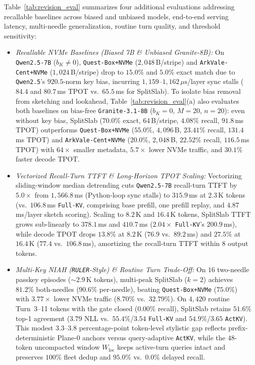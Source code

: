 \documentclass[final,5p,times,twocolumn]{elsarticle}
\theoremstyle{definition}
\theoremstyle{remark}
\newcommand{\SplitSlab}{\textup{\textsc{SplitSlab}}}
\def\SplitSlab{SplitSlab}%
\begin{document}
Table~\ref{tab:revision_eval} summarizes four additional evaluations addressing recallable baselines across biased and unbiased models, end-to-end serving latency, multi-needle generalization, routine turn quality, and threshold sensitivity:
\begin{itemize}
  \item \emph{Recallable NVMe Baselines (Biased 7B \& Unbiased Granite-8B):} On \texttt{Qwen2.5-7B} ($b_K{\neq}0$), \texttt{Quest-Box+NVMe} ($2{,}048$\,B/stripe) and \texttt{ArkVale-Cent+NVMe} ($1{,}024$\,B/stripe) drop to $15.0\%$ and $5.0\%$ exact match due to \texttt{Qwen2.5}'s $920.5$-norm key bias, incurring $1{,}159$--$1{,}162\,\mu\mathrm{s}$/layer sync stalls ($84.4$ and $80.7$\,ms TPOT vs.\ $65.5$\,ms for \SplitSlab{}). To isolate bias removal from sketching and lookahead, Table~\ref{tab:revision_eval}(a) also evaluates both baselines on bias-free \texttt{Granite-3.1-8B} ($b_K{=}0$, $M{=}20$, $n{=}20$): even without key bias, \SplitSlab{} ($70.0\%$ exact, $64$\,B/stripe, $4.08\%$ recall, $91.8$\,ms TPOT) outperforms \texttt{Quest-Box+NVMe} ($55.0\%$, $4{,}096$\,B, $23.41\%$ recall, $131.4$\,ms TPOT) and \texttt{ArkVale-Cent+NVMe} ($20.0\%$, $2{,}048$\,B, $22.52\%$ recall, $116.5$\,ms TPOT) with $64\times$ smaller metadata, $5.7\times$ lower NVMe traffic, and $30.1\%$ faster decode TPOT.
  \item \emph{Vectorized Recall-Turn TTFT \& Long-Horizon TPOT Scaling:} Vectorizing sliding-window median detrending cuts \texttt{Qwen2.5-7B} recall-turn TTFT by $5.0\times$ from $1{,}566.8$\,ms (Python-loop sync stalls) to $315.9$\,ms at $2.3$\,K tokens (vs.\ $106.8$\,ms \texttt{Full-KV}, comprising base prefill, one prefill replay, and $4.87$\,ms/layer sketch scoring). Scaling to $8.2$\,K and $16.4$\,K tokens, \SplitSlab{} TTFT grows sub-linearly to $378.1$\,ms and $410.7$\,ms ($2.04\times$ \texttt{Full-KV}'s $200.9$\,ms), while decode TPOT drops $13.8\%$ at $8.2$\,K ($76.9$ vs.\ $89.2$\,ms) and $27.5\%$ at $16.4$\,K ($77.4$ vs.\ $106.8$\,ms), amortizing the recall-turn TTFT within $8$ output tokens.
  \item \emph{Multi-Key NIAH (\texttt{RULER}-Style) \& Routine Turn Trade-Off:} On $16$ two-needle passkey episodes ($\sim\!2.9$\,K tokens), multi-peak \SplitSlab{} ($k{=}2$) achieves $81.2\%$ both-needles ($90.6\%$ per-needle), beating \texttt{Quest-Box+NVMe} ($75.0\%$) with $3.77\times$ lower NVMe traffic ($8.70\%$ vs.\ $32.79\%$). On $4{,}420$ routine Turn~3--11 tokens with the gate closed ($0.00\%$ recall), \SplitSlab{} retains $51.6\%$ top-1 agreement ($3.79$ NLL vs.\ $55.4\%$/$3.54$ \texttt{Full-KV} and $54.9\%$/$3.65$ \texttt{ActKV}). This modest $3.3$--$3.8$ percentage-point token-level stylistic gap reflects prefix-deterministic Plane-0 anchors versus query-adaptive \texttt{ActKV}, while the $48$-token uncompacted window $W_{\mathrm{loc}}$ keeps active-turn queries intact and preserves $100\%$ fleet dedup and $95.0\%$ vs.\ $0.0\%$ delayed recall.

\end{itemize}
\end{document}
